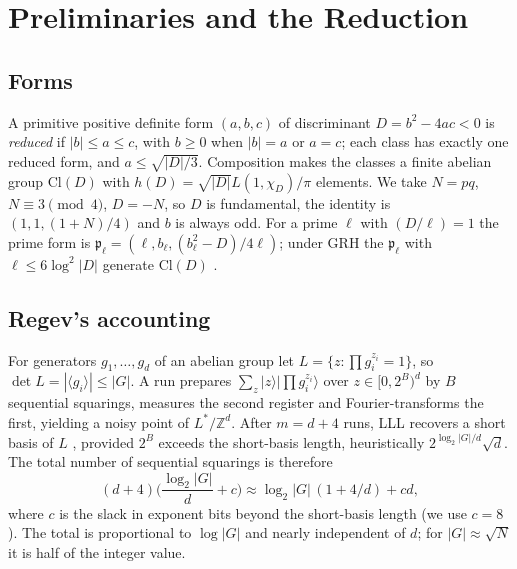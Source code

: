 \documentclass[conference]{IEEEtran}
\newcommand{\Cl}{\mathrm{Cl}}
\newcommand{\Z}{\mathbb{Z}}
\newcommand{\p}{\mathfrak{p}}
\begin{document}
\section{Preliminaries and the Reduction}\label{sec:prelim}
\subsection{Forms}
A primitive positive definite form $(a,b,c)$ of discriminant $D=b^2-4ac<0$ is \emph{reduced} if $|b|\le a\le c$, with $b\ge0$ when $|b|=a$ or $a=c$; each class has exactly one reduced form, and $a\le\sqrt{|D|/3}$. Composition makes the classes a finite abelian group $\Cl(D)$ with $h(D)=\sqrt{|D|}L(1,\chi_D)/\pi$ elements. We take $N=pq$, $N\equiv3\pmod4$, $D=-N$, so $D$ is fundamental, the identity is $(1,1,(1+N)/4)$ and $b$ is always odd. For a prime $\ell$ with $(D/\ell)=1$ the prime form is $\p_\ell=(\ell,b_\ell,(b_\ell^2-D)/4\ell)$; under GRH the $\p_\ell$ with $\ell\le6\log^2|D|$ generate $\Cl(D)$ \cite{bach1990}.

\subsection{Regev's accounting}
For generators $g_1,\dots,g_d$ of an abelian group let $L=\{z:\prod g_i^{z_i}=1\}$, so $\det L=|\langle g_i\rangle|\le|G|$. A run prepares $\sum_z|z\rangle|\prod g_i^{z_i}\rangle$ over $z\in[0,2^B)^d$ by $B$ sequential squarings, measures the second register and Fourier-transforms the first, yielding a noisy point of $L^*/\Z^d$. After $m=d+4$ runs, LLL recovers a short basis of $L$ \cite{regev2023}, provided $2^B$ exceeds the short-basis length, heuristically $2^{\log_2|G|/d}\sqrt d$. The total number of sequential squarings is therefore
\begin{equation}\label{eq:total}
(d+4)\Big(\frac{\log_2|G|}{d}+c\Big)\approx\log_2|G|\,(1+4/d)+cd,
\end{equation}
where $c$ is the slack in exponent bits beyond the short-basis length (we use $c=8$). The total is proportional to $\log|G|$ and nearly independent of $d$; for $|G|\approx\sqrt N$ it is half of the integer value.
\end{document}
